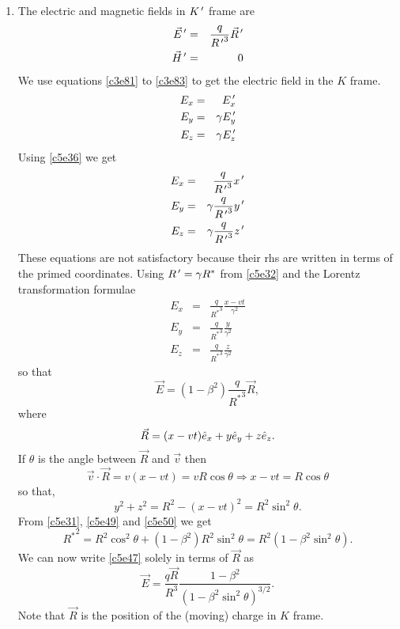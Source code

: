\begin{enumerate}
\item The electric and magnetic fields in $K^{\,\prime}$ frame are
\begin{eqnarray}
\vec{E}^{\,\prime} &=& \frac{q}{{R^{\,\prime}}^3}\vec{R}^{\,\prime} \label{c5e36} \\
\vec{H}^{\,\prime} &=& 0 \label{c5e37}
\end{eqnarray}
We use equations \eqref{c3e81} to \eqref{c3e83} to get the electric field in the
$K$ frame.
\begin{eqnarray}
E_x &=& E_x^{\,\prime} \label{c5e38} \\
E_y &=& \gamma E_y^{\,\prime} \label{c5e39} \\
E_z &=& \gamma E_z^{\,\prime} \label{c5e40}
\end{eqnarray}
Using \eqref{c5e36} we get
\begin{eqnarray}
E_x &=& \frac{q}{{R^{\,\prime}}^3}x^{\,\prime} \label{c5e41} \\
E_y &=& \gamma\frac{q}{{R^{\,\prime}}^3}y^{\,\prime} \label{c5e42} \\
E_z &=& \gamma\frac{q}{{R^{\,\prime}}^3}z^{\,\prime} \label{c5e43}
\end{eqnarray}
These equations are not satisfactory because their rhs are written in terms of
the primed coordinates. Using $R^{\,\prime} = \gamma R^\ast$ from \eqref{c5e32} and the
Lorentz transformation formulae
\begin{eqnarray}
E_x &=& \frac{q}{{R^\ast}^3}\frac{x - vt}{\gamma^2} \label{c5e44} \\
E_y &=& \frac{q}{{R^\ast}^3}\frac{y}{\gamma^2} \label{c5e45} \\
E_z &=& \frac{q}{{R^\ast}^3}\frac{z}{\gamma^2} \label{c5e46}
\end{eqnarray}
so that
\begin{equation}\label{c5e47}
\vec{E} = (1 - \beta^2)\frac{q}{{R^\ast}^3}\vec{R},
\end{equation}
where
\begin{equation}\label{c5e48}
\vec{R} = (x - vt)\hat{e}_{x} + y\hat{e}_{y} + z\hat{e}_{z}.
\end{equation}
If $\theta$ is the angle between $\vec{R}$ and $\vec{v}$ then
\begin{equation}\label{c5e49}
\vec{v}\cdot\vec{R} = v(x - vt) = vR\cos\theta \Rightarrow x - vt = R\cos\theta
\end{equation}
so that,
\begin{equation}\label{c5e50}
y^2 + z^2 = R^2 - (x - vt)^2 = R^2\sin^2\theta.
\end{equation}
From \eqref{c5e31}, \eqref{c5e49} and \eqref{c5e50} we get
\begin{equation}\label{c5e51}
{R^\ast}^2 = R^2\cos^2\theta + (1 - \beta^2)R^2\sin^2\theta = 
R^2(1 - \beta^2\sin^2\theta).
\end{equation}
We can now write \eqref{c5e47} solely in terms of $\vec{R}$ as
\begin{equation}\label{c5e52}
\vec{E} = \frac{q\vec{R}}{R^3} \frac{1 - \beta^2}{(1 - \beta^2\sin^2\theta)^{3/2}}.
\end{equation}
Note that $\vec{R}$ is the position of the (moving) charge in $K$ frame.


\end{enumerate}

